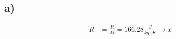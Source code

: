 

\subsection*{a)}
\begin{align*}
    R &= \frac{R}{M} = 166.28 \frac{J}{kg \cdot K} \rightarrow x
\end{align*}